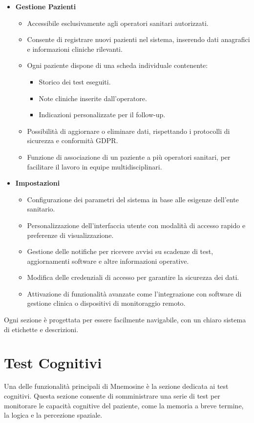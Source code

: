 \documentclass[a4paper,12pt]{book}
\begin{document}
\begin{itemize}
		\item \textbf{Gestione Pazienti}
		\begin{itemize}
			\item Accessibile esclusivamente agli operatori sanitari autorizzati.
			\item Consente di registrare nuovi pazienti nel sistema, inserendo dati anagrafici e informazioni cliniche rilevanti.
			\item Ogni paziente dispone di una scheda individuale contenente:
			\begin{itemize}
				\item Storico dei test eseguiti.
				\item Note cliniche inserite dall’operatore.
				\item Indicazioni personalizzate per il follow-up.
			\end{itemize}
			\item Possibilità di aggiornare o eliminare dati, rispettando i protocolli di sicurezza e conformità GDPR.
			\item Funzione di associazione di un paziente a più operatori sanitari, per facilitare il lavoro in equipe multidisciplinari.
		\end{itemize}
		
		\item \textbf{Impostazioni}
		\begin{itemize}
			\item Configurazione dei parametri del sistema in base alle esigenze dell’ente sanitario.
			\item Personalizzazione dell’interfaccia utente con modalità di accesso rapido e preferenze di visualizzazione.
			\item Gestione delle notifiche per ricevere avvisi su scadenze di test, aggiornamenti software e altre informazioni operative.
			\item Modifica delle credenziali di accesso per garantire la sicurezza dei dati.
			\item Attivazione di funzionalità avanzate come l’integrazione con software di gestione clinica o dispositivi di monitoraggio remoto.
		\end{itemize}
	\end{itemize}
	
	Ogni sezione è progettata per essere facilmente navigabile, con un chiaro sistema di etichette e descrizioni.
	
	\section{Test Cognitivi}
	Una delle funzionalità principali di Mnemosine è la sezione dedicata ai test cognitivi. Questa sezione consente di somministrare una serie di test per monitorare le capacità cognitive del paziente, come la memoria a breve termine, la logica e la percezione spaziale.
	
\end{document}
